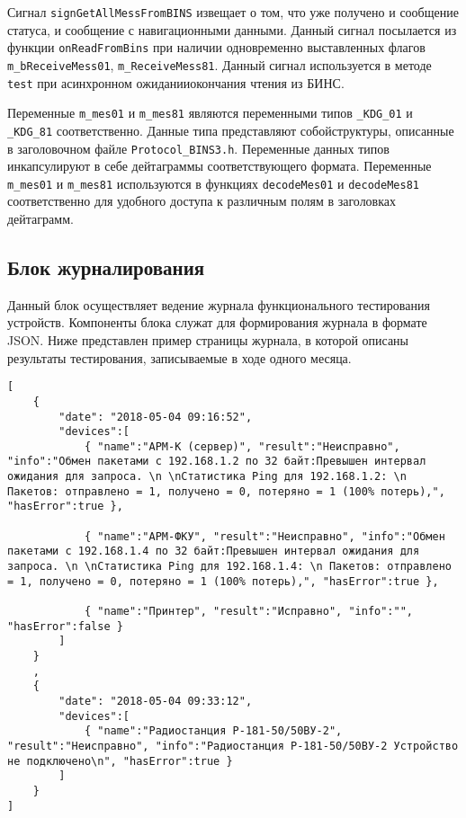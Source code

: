 \begin{enum}
	\item Сигнал \texttt{signGetAllMessFromBINS} извещает о том, что уже получено и сообщение статуса, и сообщение с
		навигационными данными. Данный сигнал посылается из функции \texttt{onReadFromBins} при наличии
		одновременно выставленных флагов
		\texttt{m\_bReceiveMess01}, \texttt{m\_ReceiveMess81}. Данный сигнал используется в методе
		\texttt{test} при асинхронном ожидании\break окончания чтения из БИНС.

	\item Переменные \texttt{m\_mes01} и \texttt{m\_mes81} являются переменными типов \texttt{\_KDG\_01} и
		\texttt{\_KDG\_81} соответственно. Данные типа представляют собой\break структуры, описанные в заголовочном
		файле \texttt{Protocol\_BINS3.h}. Переменные данных типов инкапсулируют в себе дейтаграммы
		соответствующего формата. Переменные \texttt{m\_mes01} и \texttt{m\_mes81} используются в функциях
		\texttt{decodeMes01} и \texttt{decodeMes81} соответственно для удобного доступа к различным полям в
		заголовках дейтаграмм.
\end{enum}

\subsection{Блок журналирования}
Данный блок осуществляет ведение журнала функционального тестирования устройств. Компоненты блока служат для
формирования журнала в формате JSON.
Ниже представлен пример страницы журнала, в которой описаны результаты тестирования, записываемые в ходе одного месяца.
\medskip
\begin{verbatim}
[
	{
		"date": "2018-05-04 09:16:52",
		"devices":[
			{ "name":"АРМ-К (сервер)", "result":"Неисправно", "info":"Обмен пакетами с 192.168.1.2 по 32 байт:Превышен интервал ожидания для запроса. \n \nСтатистика Ping для 192.168.1.2: \n Пакетов: отправлено = 1, получено = 0, потеряно = 1 (100% потерь),", "hasError":true },

			{ "name":"АРМ-ФКУ", "result":"Неисправно", "info":"Обмен пакетами с 192.168.1.4 по 32 байт:Превышен интервал ожидания для запроса. \n \nСтатистика Ping для 192.168.1.4: \n Пакетов: отправлено = 1, получено = 0, потеряно = 1 (100% потерь),", "hasError":true },

			{ "name":"Принтер", "result":"Исправно", "info":"", "hasError":false }
		]
	}
	,
	{
		"date": "2018-05-04 09:33:12",
		"devices":[
			{ "name":"Радиостанция Р-181-50/50ВУ-2", "result":"Неисправно", "info":"Радиостанция Р-181-50/50ВУ-2 Устройство не подключено\n", "hasError":true }
		]
	}
]

\end{verbatim}

